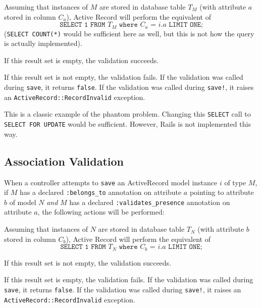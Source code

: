 \begin{myenumeratee} 
\small

\item Assuming that instances of $M$ are stored in database table $T_M$ (with attribute $a$ stored in column $C_a$), Active Record will perform the equivalent of $$\texttt{SELECT 1 FROM $T_M$ where $C_a$ = $i.a$ LIMIT ONE;}$$ (\texttt{SELECT COUNT(*)} would be sufficient here as well, but this is not how the query is actually implemented).

\item If this result set is empty, the validation succeeds.

\item If this result set is not empty, the validation fails. If the validation was called during \texttt{save}, it returns \texttt{false}. If the validation was called during \texttt{save!}, it raises an \texttt{ActiveRecord::RecordInvalid} exception.

\end{myenumeratee}

This is a classic example of the phantom problem. Changing this \texttt{SELECT} call to \texttt{SELECT FOR UPDATE} would be sufficient. However, Rails is not implemented this way.
\pagebreak
\subsection{Association Validation}
\label{sec:appendix-association-behavior}

 When a controller attempts to \texttt{save} an ActiveRecord model instance $i$ of type $M$, if $M$ has a declared \texttt{:belongs\_to} annotation on attribute $a$ pointing to attribute $b$ of model $N$ \textit{and} $M$ has a declared \texttt{:validates\_presence} annotation on attribute $a$, the following actions will be performed:

\begin{myenumerateee} 
\small
\item Assuming that instances of $N$ are stored in database table $T_N$ (with attribute $b$ stored in column $C_b$), Active Record will perform the equivalent of $$\texttt{SELECT 1 FROM $T_N$ where $C_b$ = $i.a$ LIMIT ONE;}$$

\item If this result set is not empty, the validation succeeds.

\item If this result set is empty, the validation fails. If the validation was called during \texttt{save}, it returns \texttt{false}. If the validation was called during \texttt{save!}, it raises an \texttt{ActiveRecord::RecordInvalid} exception.

\end{myenumerateee}

